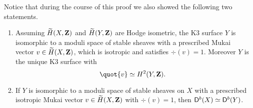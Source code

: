 \begin{remark}
    Notice that during the course of this proof we also showed the following two statements.
    \begin{enumerate}[label=(\roman*)]
        \item{Assuming $\widetilde{H}(X, \mathbf Z)$ and $\widetilde{H}(Y, \mathbf Z)$ are Hodge isometric, the K3 surface $Y$ is isomorphic to a moduli space of stable sheaves with a prescribed Mukai vector $v \in \widetilde{H}(X, \mathbf Z)$, which is isotropic and satisfies $\div(v) = 1$. Moreover $Y$ is the unique K3 surface with
        \[
            \quot{v} \iso \cohom{2}{Y}{\Z}.
        \]
        }
        \item{
            If $Y$ is isomorphic to a moduli space of stable sheaves on $X$ with a prescribed isotropic Mukai vector $v \in \widetilde{H}(X, \mathbf Z)$ with $\div(v) = 1$, then $\mathsf{D}^b(X) \simeq \mathsf{D}^b(Y)$.
        }
    \end{enumerate}
        
\end{remark}






